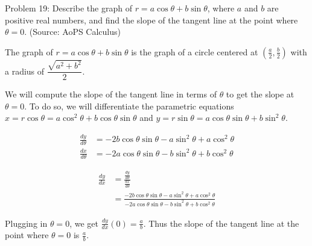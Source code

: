 Problem 19: Describe the graph of $r = a \cos \theta + b \sin \theta$, where $a$ and $b$ are positive real numbers, and find the slope of the tangent line at the point where $\theta = 0$. (Source: AoPS Calculus)

The graph of $r = a \cos \theta + b \sin \theta$ is the graph of a circle centered at $\left(\frac{a}{2}, \frac{b}{2}\right)$ with a radius of $\dfrac{\sqrt{a^2 + b^2}}{2}$.

We will compute the slope of the tangent line in terms of $\theta$ to get the slope at $\theta = 0$. To do so, we will differentiate the parametric equations $x = r \cos \theta = a \cos^2 \theta + b \cos \theta \sin \theta$ and $y = r \sin \theta = a \cos \theta \sin \theta + b \sin^2 \theta$.

\begin{align*}
\frac{dy}{d\theta} &= -2b \cos \theta \sin \theta - a \sin^2 \theta + a \cos^2 \theta \\
\frac{dx}{d\theta} &= - 2a \cos \theta \sin \theta - b \sin^2 \theta + b \cos^2 \theta
\end{align*}

\begin{align*}
\frac{dy}{dx} &= \frac{\frac{dy}{d\theta}}{\frac{dx}{d\theta}} \\
&= \frac{-2b \cos \theta \sin \theta - a \sin^2 \theta + a \cos^2 \theta}{- 2a \cos \theta \sin \theta - b \sin^2 \theta + b \cos^2 \theta}
\end{align*}

Plugging in $\theta = 0$, we get $\frac{dy}{dx}(0) = \frac{a}{b}$. Thus the slope of the tangent line at the point where $\theta = 0$ is $\boxed{\frac{a}{b}}$.
